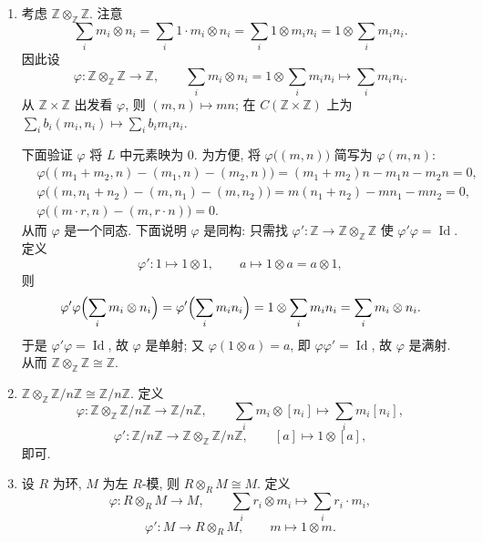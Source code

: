 \begin{example}\label{ex:tensor-basic}
\mbox{}\par\vspace{-0.2em}
\begin{enumerate}
\item 考虑 $\mathbb{Z}\otimes_{\mathbb{Z}}\mathbb{Z}$. 注意
\[
  \sum_i m_i\otimes n_i=\sum_i 1\cdot m_i\otimes n_i=\sum_i 1\otimes m_i n_i=1\otimes\sum_i m_i n_i .
\]
因此设
\[
  \varphi\colon \mathbb{Z}\otimes_{\mathbb{Z}}\mathbb{Z}\longrightarrow\mathbb{Z},\qquad
  \sum_i m_i\otimes n_i=1\otimes\sum_i m_i n_i\longmapsto\sum_i m_i n_i .
\]
从 $\mathbb{Z}\times\mathbb{Z}$ 出发看 $\varphi$, 则 $(m,n)\mapsto mn$; 在 $C(\mathbb{Z}\times\mathbb{Z})$ 上为
$\sum_i b_i(m_i,n_i)\mapsto\sum_i b_i m_i n_i$.

下面验证 $\varphi$ 将 $L$ 中元素映为 $0$. 为方便, 将 $\varphi\bigl((m,n)\bigr)$ 简写为 $\varphi(m,n)$:
\[
  \begin{aligned}
    &\varphi\bigl((m_1+m_2,n)-(m_1,n)-(m_2,n)\bigr)=(m_1+m_2)n-m_1n-m_2n=0,\\
    &\varphi\bigl((m,n_1+n_2)-(m,n_1)-(m,n_2)\bigr)=m(n_1+n_2)-mn_1-mn_2=0,\\
    &\varphi\bigl((m\cdot r,n)-(m,r\cdot n)\bigr)=0 .
  \end{aligned}
\]
从而 $\varphi$ 是一个同态. 下面说明 $\varphi$ 是同构: 只需找 $\varphi'\colon\mathbb{Z}\to\mathbb{Z}\otimes_{\mathbb{Z}}\mathbb{Z}$
使 $\varphi'\varphi=\operatorname{Id}$. 定义
\[
  \varphi'\colon 1\longmapsto 1\otimes 1,\qquad a\longmapsto 1\otimes a=a\otimes 1,
\]
则
\[
  \varphi'\varphi\Bigl(\sum_i m_i\otimes n_i\Bigr)=\varphi'\Bigl(\sum_i m_i n_i\Bigr)
  =1\otimes\sum_i m_i n_i=\sum_i m_i\otimes n_i .
\]
于是 $\varphi'\varphi=\operatorname{Id}$, 故 $\varphi$ 是单射; 又 $\varphi(1\otimes a)=a$, 即 $\varphi\varphi'=\operatorname{Id}$, 故 $\varphi$ 是满射. 从而 $\mathbb{Z}\otimes_{\mathbb{Z}}\mathbb{Z}\cong\mathbb{Z}$.

\item $\mathbb{Z}\otimes_{\mathbb{Z}}\mathbb{Z}/n\mathbb{Z}\cong\mathbb{Z}/n\mathbb{Z}$. 定义
\[
  \varphi\colon \mathbb{Z}\otimes_{\mathbb{Z}}\mathbb{Z}/n\mathbb{Z}\longrightarrow\mathbb{Z}/n\mathbb{Z},\qquad
  \sum_i m_i\otimes[n_i]\longmapsto\sum_i m_i[n_i],
\]
\[
  \varphi'\colon \mathbb{Z}/n\mathbb{Z}\longrightarrow\mathbb{Z}\otimes_{\mathbb{Z}}\mathbb{Z}/n\mathbb{Z},\qquad
  [a]\longmapsto 1\otimes[a],
\]
即可.

\item 设 $R$ 为环, $M$ 为左 $R$-模, 则 $R\otimes_R M\cong M$. 定义
\[
    \varphi\colon R\otimes_R M\longrightarrow M,\qquad \sum_i r_i\otimes m_i\longmapsto\sum_i r_i\cdot m_i,
\]
\[
    \varphi'\colon M\longrightarrow R\otimes_R M,\qquad m\longmapsto 1\otimes m .
\]


\end{enumerate}
\end{example}

